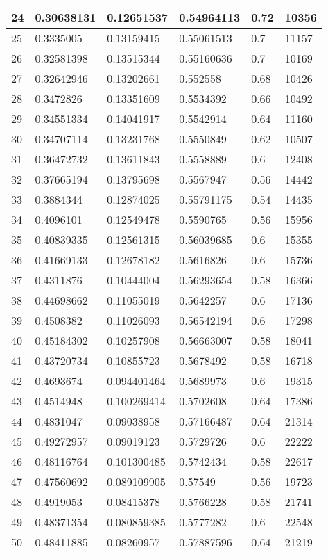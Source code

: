 \begin{longtable}{|l|l|l|l|l|l|}
24 & 0.30638131 & 0.12651537 & 0.54964113 & 0.72 & 10356 \\ \hline 
25 & 0.3335005 & 0.13159415 & 0.55061513 & 0.7 & 11157 \\ \hline 
26 & 0.32581398 & 0.13515344 & 0.55160636 & 0.7 & 10169 \\ \hline 
27 & 0.32642946 & 0.13202661 & 0.552558 & 0.68 & 10426 \\ \hline 
28 & 0.3472826 & 0.13351609 & 0.5534392 & 0.66 & 10492 \\ \hline 
29 & 0.34551334 & 0.14041917 & 0.5542914 & 0.64 & 11160 \\ \hline 
30 & 0.34707114 & 0.13231768 & 0.5550849 & 0.62 & 10507 \\ \hline 
31 & 0.36472732 & 0.13611843 & 0.5558889 & 0.6 & 12408 \\ \hline 
32 & 0.37665194 & 0.13795698 & 0.5567947 & 0.56 & 14442 \\ \hline 
33 & 0.3884344 & 0.12874025 & 0.55791175 & 0.54 & 14435 \\ \hline 
34 & 0.4096101 & 0.12549478 & 0.5590765 & 0.56 & 15956 \\ \hline 
35 & 0.40839335 & 0.12561315 & 0.56039685 & 0.6 & 15355 \\ \hline 
36 & 0.41669133 & 0.12678182 & 0.5616826 & 0.6 & 15736 \\ \hline 
37 & 0.4311876 & 0.10444004 & 0.56293654 & 0.58 & 16366 \\ \hline 
38 & 0.44698662 & 0.11055019 & 0.5642257 & 0.6 & 17136 \\ \hline 
39 & 0.4508382 & 0.11026093 & 0.56542194 & 0.6 & 17298 \\ \hline 
40 & 0.45184302 & 0.10257908 & 0.56663007 & 0.58 & 18041 \\ \hline 
41 & 0.43720734 & 0.10855723 & 0.5678492 & 0.58 & 16718 \\ \hline 
42 & 0.4693674 & 0.094401464 & 0.5689973 & 0.6 & 19315 \\ \hline 
43 & 0.4514948 & 0.100269414 & 0.5702608 & 0.64 & 17386 \\ \hline 
44 & 0.4831047 & 0.09038958 & 0.57166487 & 0.64 & 21314 \\ \hline 
45 & 0.49272957 & 0.09019123 & 0.5729726 & 0.6 & 22222 \\ \hline 
46 & 0.48116764 & 0.101300485 & 0.5742434 & 0.58 & 22617 \\ \hline 
47 & 0.47560692 & 0.089109905 & 0.57549 & 0.56 & 19723 \\ \hline 
48 & 0.4919053 & 0.08415378 & 0.5766228 & 0.58 & 21741 \\ \hline 
49 & 0.48371354 & 0.080859385 & 0.5777282 & 0.6 & 22548 \\ \hline 
50 & 0.48411885 & 0.08260957 & 0.57887596 & 0.64 & 21219 \\ \hline 
\end{longtable}